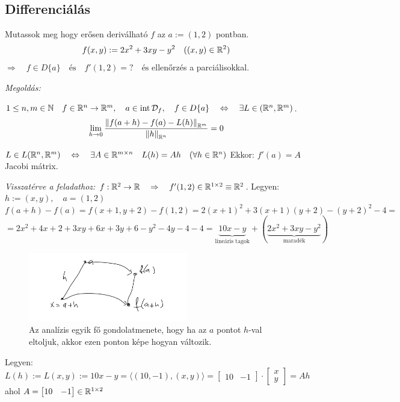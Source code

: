 \documentclass[a4paper,11.5pt]{article}
\DeclareMathOperator{\Int}{int}
\newcommand{\norm}[1]{\left\lVert#1\right\rVert}
\begin{document}
	\subsection{Differenciálás}
	\begin{task} 
		Mutassok meg hogy erősen deriválható $f$ az $a:=(1,2)$ pontban.
		\[ f(x,y):=2x^2+3xy-y^2 \quad ((x,y)\in\mathbb{R}^2) \]
		$\Rightarrow\quad f\in D\{a\}\quad \text{és}\quad f'(1,2)=?\quad \text{és}$ ellenőrzés a parciálisokkal.
		
		\textit{Megoldás:}
		\begin{revision}
			$1\leq n,m\in\N\quad f\in\R^n\to\R^m,\quad a\in \Int \mathcal{D}_f,\quad f\in D\{ a \}\quad \Leftrightarrow \quad \exists L\in\LARGE(\R^n,\R^m)$.
			\[ \lim_{h\to0} \frac{\norm{f(a+h)-f(a)-L(h)}_{\R^m}}{\norm{h}_{\R^n}}=0 \]
		\end{revision}
		\begin{revision}
			$L\in L(\mathbb{R}^n,\mathbb{R}^m)\quad \Leftrightarrow\quad \exists A\in\mathbb{R}^{m\times n}\quad L(h)=Ah\quad (\forall h\in\mathbb{R}^n)$
		 Ekkor: $f'(a)=A$ Jacobi mátrix.
		\end{revision}
		\textit{Visszatérve a feladathoz:} $f:\mathbb{R}^2\to\mathbb{R}\quad \Rightarrow\quad f'(1,2)\in\mathbb{R}^{1\times 2}\equiv \mathbb{R}{^2}$.\quad 
		Legyen: $h:=(x,y),\quad a=(1,2)$
		\[ f(a+h)-f(a)=f(x+1,y+2)-f(1,2)=2(x+1)^2+3(x+1)(y+2)-(y+2)^2-4=\]\[=2x^2+4x+2+3xy+6x+3y+6-y^2-4y-4-4=\underbrace{10x-y}_{\text{lineáris tagok}}+(\underbrace{2x^2+3xy-y^2}_{\text{maradék}}) \]
		\begin{figure}[H]
			\centering
			\includegraphics[height=3cm]{../2zh/kepek/28.png}
			\caption{Az analízis egyik fő gondolatmenete, hogy ha az $a$ pontot $h$-val eltoljuk, akkor ezen ponton képe hogyan változik.}
		\end{figure}
		Legyen: $L(h):=L(x,y):=10x-y=\langle(10,-1),(x,y)\rangle=\begin{bmatrix}
			10&-1
		\end{bmatrix}\cdot \begin{bmatrix}
			x\\y
		\end{bmatrix} =Ah$ ahol $A=\begin{bmatrix}
		10&-1
		\end{bmatrix}\in\mathbb{R}^{1\times2}$
		

\end{task}
\end{document}
